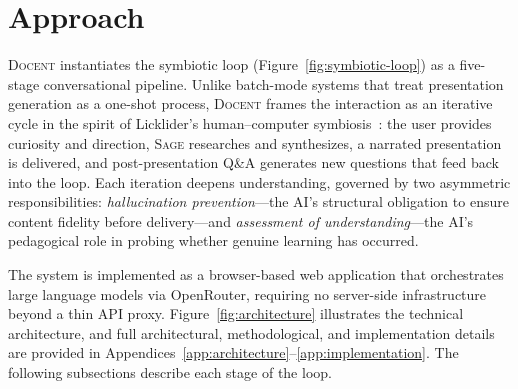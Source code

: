 \documentclass[11pt,a4paper]{article}
\newcommand{\system}{\textsc{Docent}\xspace}
\newcommand{\sage}{\textsc{Sage}\xspace}
\begin{document}

\section{Approach}
\label{sec:approach}

\system instantiates the symbiotic loop (Figure~\ref{fig:symbiotic-loop}) as a five-stage conversational pipeline.
Unlike batch-mode systems that treat presentation generation as a one-shot process, \system frames the interaction as an iterative cycle in the spirit of Licklider's human--computer symbiosis~\citep{licklider1960symbiosis}: the user provides curiosity and direction, \sage researches and synthesizes, a narrated presentation is delivered, and post-presentation Q\&A generates new questions that feed back into the loop.
Each iteration deepens understanding, governed by two asymmetric responsibilities: \emph{hallucination prevention}---the AI's structural obligation to ensure content fidelity before delivery---and \emph{assessment of understanding}---the AI's pedagogical role in probing whether genuine learning has occurred.

The system is implemented as a browser-based web application that orchestrates large language models via OpenRouter, requiring no server-side infrastructure beyond a thin API proxy.
Figure~\ref{fig:architecture} illustrates the technical architecture, and full architectural, methodological, and implementation details are provided in Appendices~\ref{app:architecture}--\ref{app:implementation}.
The following subsections describe each stage of the loop.
\end{document}
